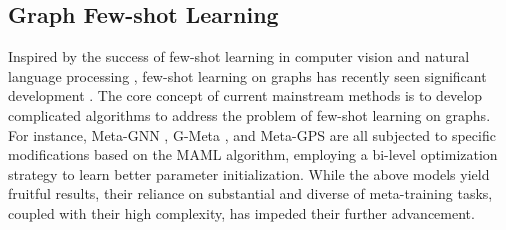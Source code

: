 
\subsection{Graph Few-shot Learning}
Inspired by the success of few-shot learning in computer vision \cite{lifchitz2019dense, bateni2020improved, tian2020rethinking} and natural language processing \cite{mukherjee2020uncertainty, bao2019few, wang2021grad2task}, few-shot learning on graphs has recently seen significant development \cite{liu2022few, wang2022task, wang2023few, tan2023virtual, liu2024meta, liu2024simple, liu2025enhancing}. %
The core concept of current mainstream methods is to develop complicated algorithms to address the problem of few-shot learning on graphs. For instance, Meta-GNN \cite{zhou2019meta}, G-Meta \cite{huang2020graph}, and Meta-GPS \cite{liu2022few} are all subjected to specific modifications based on the MAML \cite{finn2017model} algorithm, employing a bi-level optimization strategy to learn better parameter initialization. %
While the above models yield fruitful results, their reliance on substantial and diverse of meta-training tasks, coupled with their high complexity, has impeded their further advancement. %
